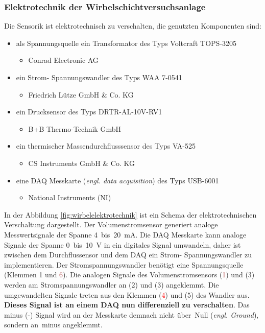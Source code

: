 \subsubsection{Elektrotechnik der Wirbelschichtversuchsanlage}
\label{sec:schaltung}
Die Sensorik ist elektrotechnisch zu verschalten, die genutzten Komponenten sind:

\begin{itemize}
\item als Spannungsquelle ein Transformator des Typs Voltcraft TOPS-3205   
\begin{itemize}
\item Conrad Electronic AG
\end{itemize}

\item ein Strom- Spannungswandler des Typs WAA 7-0541 
\begin{itemize}
\item Friedrich Lütze GmbH \& Co. KG
\end{itemize}

\item ein Drucksensor des Typs DRTR-AL-10V-RV1
\begin{itemize}
\item B+B Thermo-Technik GmbH
\end{itemize}

\item ein thermischer Massendurchflusssensor des Typs VA-525
\begin{itemize}
\item CS Instruments GmbH \& Co. KG
\end{itemize}

\item eine DAQ Messkarte (\textit{engl. data acquisition}) des Typs USB-6001 
\begin{itemize}
\item National Instruments (NI)
\end{itemize}
\end{itemize}

In der Abbildung \ref{fig:wirbelelektrotechnik} ist ein Schema der elektrotechnischen Verschaltung dargestellt. Der Volumenstromsensor generiert analoge Messwertsignale der Spanne 4~bis~20~mA. Die DAQ Messkarte kann analoge  Signale der Spanne 0~bis~10~V in ein digitales Signal umwandeln, daher ist zwischen dem Durchflussensor und dem DAQ ein Strom- Spannungswandler zu implementieren. Der Stromspannungswandler benötigt eine Spannungsquelle (Klemmen 1 und \textcolor{brown}{6}). Die analogen Signale des Volumenstromsensors (\textcolor{brown}{1}) und (3) werden am Stromspannungswandler an (2) und (\textcolor{black!50}{3}) angeklemmt. Die umgewandelten Signale treten aus den Klemmen (\textcolor{red}{4}) und (5) des Wandler aus. \textbf{Dieses Signal ist an einem DAQ nun differenziell zu verschalten}. Das \,{\Menlo minus} (-) Signal wird an der Messkarte demnach nicht über \,{\Menlo Null} (\textit{engl. Ground}), sondern an \,{\Menlo minus} angeklemmt. \\

